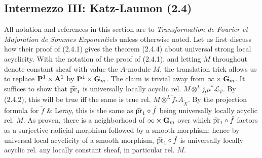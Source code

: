 \documentclass[deligne.tex]{subfiles}
\begin{document}
\subsection*{Intermezzo III: Katz-Laumon (2.4)}
All notation and references in this section are to
\emph{Transformation de Fourier et Majoration de Sommes Exponentiels}
unless otherwise noted.
Let us first discuss how their proof of (2.4.1) gives the theorem (2.4.4)
about universal strong local acyclicity.
With the notation of the proof of (2.4.1), and letting $M$ throughout 
denote constant sheaf with value the $A$-module $M$,
the translation trick allows us to replace $\mathbf{P}^1\times\mathbf{A}^1$ by
$\mathbf{P}^1\times\mathbf{G}_m$.
The claim is trivial away from $\infty\times\mathbf{G}_m$.
It suffices to show that $\widetilde{\operatorname{pr}}_1$ is universally locally acyclic
rel. $M\otimes^L j_!\mu^*\mathscr L_\psi$. By (2.4.2), this will be true
iff the same is true rel. $M\otimes^L\tilde f_*A_{\tilde X}$.
By the projection formula for $\tilde f$ \& Leray, this is the same as
$\widetilde{\operatorname{pr}}_1\circ\tilde f$ being universally locally acyclic
rel. $M$. As proven, there is a neighborhood of $\infty\times\mathbf{G}_m$ over
which $\widetilde{\operatorname{pr}}_1\circ\tilde f$ factors as a surjective radicial
morphism followed by a smooth morphism; hence by universal local acyclicity
of a smooth morphism, $\widetilde{\operatorname{pr}}_1\circ\tilde f$ is universally locally
acyclic rel. any locally constant sheaf, in particular rel. $M$.
\end{document}
